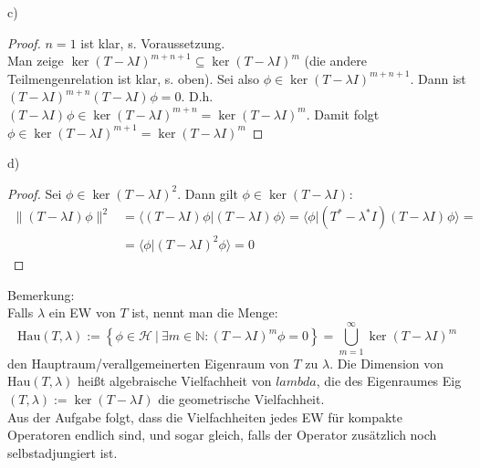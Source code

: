 \documentclass[a4paper,12pt]{article}
\newcommand{\brak}{}
\newcommand{\kla}{}
\newcommand{\klammer}{}
\newcommand{\tecxt}{}
\begin{document}
c)
\begin{proof}
$n=1$ ist klar, s. Voraussetzung. \\
Man zeige $\ker\kla\left( {T-\lambda I} \right)^{m+n+1}\subseteq\ker\kla\left( {T-\lambda I} \right)^{m}$ (die andere Teilmengenrelation ist klar, s. oben). Sei also $\phi\in\ker\kla\left( {T-\lambda I} \right)^{m+n+1}$. Dann ist $\left( {T-\lambda I} \right)^{m+n}\left( {T-\lambda I} \right)^{ }\phi=0$. D.h. $\left( {T-\lambda I} \right)^{ }\phi\in\ker\left( {T-\lambda I} \right)^{m+n}=\ker\left( {T-\lambda I} \right)^{m}$. Damit folgt $\phi\in\ker\left( {T-\lambda I} \right)^{m+1}=\ker\left( {T-\lambda I} \right)^{m}$
\end{proof}
d)
\begin{proof}
Sei $\phi\in\ker\left( {T-\lambda I} \right)^{2}$. Dann gilt $\phi\in\ker\left( {T-\lambda I} \right)^{ }$:
\begin{align*}
\|\left( {T-\lambda I} \right)^{ }\phi\|^2&=\brak\langle {\left( {T-\lambda I} \right)^{ }\phi}| {\left( {T-\lambda I} \right)^{ }\phi}\rangle=\brak\langle {\phi}| {(T^\ast-\lambda^\ast I)\left( {T-\lambda I} \right)^{ }\phi}\rangle=\\
&=\brak\langle {\phi}| {\left( {T-\lambda I} \right)^{2}\phi}\rangle=0
\end{align*}
\end{proof}
Bemerkung:\\
Falls $\lambda$ ein EW von $T$ ist, nennt man die Menge:
$$\tecxt\text{Hau}(T,\lambda):=\klammer\left\{ {\phi\in\mathcal{H}\ \vert\ \exists m\in\mathbb{N}:(T-\lambda I)^m\phi=0} \right\}=\bigcup_{m=1}^\infty\ker (T-\lambda I)^m$$
den Hauptraum/verallgemeinerten Eigenraum von $T$ zu $\lambda$. Die Dimension von Hau$(T,\lambda)$ heißt algebraische Vielfachheit von $lambda$, die des Eigenraumes Eig$(T,\lambda):=\ker (T-\lambda I)$ die geometrische Vielfachheit. \\
Aus der Aufgabe folgt, dass die Vielfachheiten jedes EW für kompakte Operatoren endlich sind, und sogar gleich, falls der Operator zusätzlich noch selbstadjungiert ist.  
\end{document}
